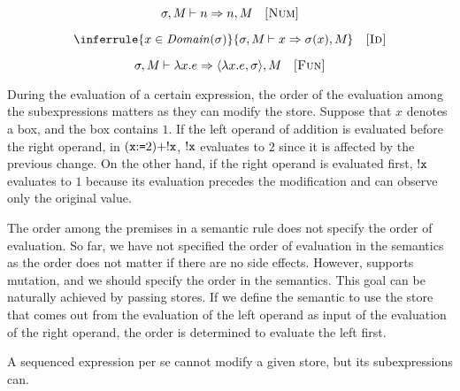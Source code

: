 
\vspace{-1em}

\[
  \sigma,M_{}\vdash n\Rightarrow n,M_{}
  \quad\textsc{[Num]}
\]

\vspace{-1em}


\vspace{-1em}

\[
  \inferrule
  { x\in\dom{\sigma} }
  { \sevald{}{x}{\sigma(x)}{} }
  \quad\textsc{[Id]}
\]

\vspace{-1em}


\vspace{-1em}

\[
  \sigma,M_{}\vdash\lambda x.e\Rightarrow\langle\lambda x.e,\sigma\rangle,M_{}
  \quad\textsc{[Fun]}
\]

During the evaluation of a certain expression,
the order of the evaluation among the subexpressions matters as they can modify the
store. Suppose that $x$ denotes a box, and the box contains $1$.
If the left operand of addition is evaluated before the right operand, in
$(\texttt{x}{:}\texttt{=}2)+!\texttt{x}$, $!\texttt{x}$ evaluates to $2$ since it is
affected by the previous change. On the other hand, if the
right operand is evaluated first, $!\texttt{x}$ evaluates to $1$ because
its evaluation precedes the modification and can observe only the original
value.

The order among the premises in a semantic rule does not specify the order of
evaluation. So far, we have not specified the order of evaluation in the
semantics as the order does not matter if there are no side
effects.
 However, \lang supports mutation, and we should specify
the order in the semantics. This goal can be naturally achieved by passing
stores. If we define the semantic to use the store that comes out from the
evaluation of the left operand as input of the evaluation of the right operand,
the order is determined to evaluate the left first.

A sequenced expression per se cannot modify a given store, but its subexpressions
can.

